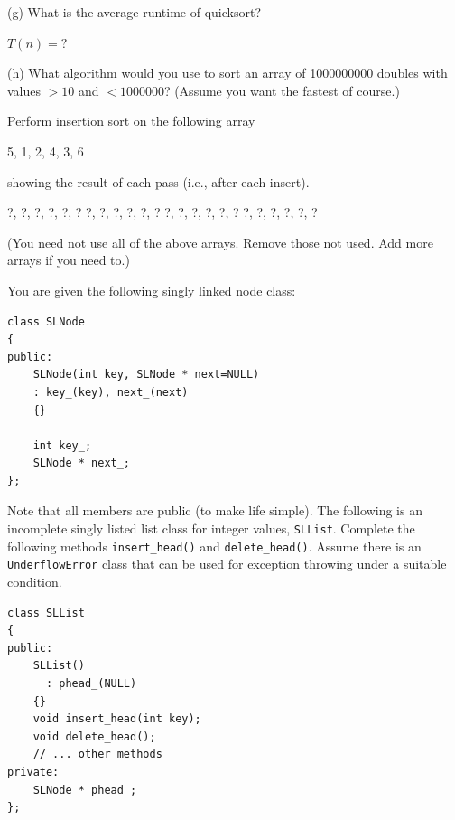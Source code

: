(g)
What is the average runtime of quicksort?
\\
\ANSWER
\begin{answerlong}
$T(n) = ?$
\end{answerlong}
  
(h)
What algorithm would you use to sort an array of 1000000000 doubles
with values $> 10$ and $< 1000000$?
(Assume you want the fastest of course.)
\\
\ANSWER
\begin{answerlong}

\end{answerlong}
 
\newpage
\nextq %
Perform insertion sort on the following array
\begin{console}
{5, 1, 2, 4, 3, 6}
\end{console}
showing the result of each pass (i.e., after each insert).
\\
\ANSWER
\begin{answercode}
{?, ?, ?, ?, ?, ?}
{?, ?, ?, ?, ?, ?}
{?, ?, ?, ?, ?, ?}
{?, ?, ?, ?, ?, ?}
\end{answercode}
(You need not use all of the above arrays. Remove those not used.
Add more arrays if you need to.)

\newpage
\nextq
You are given the following singly linked node class:
\vspace{-3mm}
\begin{Verbatim}[frame=single,fontsize=\small]
class SLNode
{
public:
    SLNode(int key, SLNode * next=NULL)
    : key_(key), next_(next)
    {}
    
    int key_;
    SLNode * next_;
};
\end{Verbatim}
\vspace{-4mm}
Note that all members are public (to make life simple).
The following is an incomplete singly listed list class for integer
values,
\verb!SLList!.
Complete the following methods \verb!insert_head()! and \verb!delete_head()!.
Assume there is an \verb!UnderflowError! class that can be used for exception
throwing under a suitable condition.
\vspace{-3mm}
\begin{Verbatim}[frame=single,fontsize=\small]
class SLList
{
public:
    SLList()
      : phead_(NULL)
    {}
    void insert_head(int key);
    void delete_head();
    // ... other methods
private:
    SLNode * phead_;
};
\end{Verbatim}

